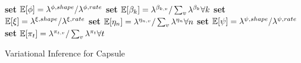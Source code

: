 \begin{algorithm}
{{	}

	\textbf{set} $\mathbb{E}[\phi] = \lambda^{\phi,shape} / \lambda^{\phi,rate}$ \;
	\textbf{set} $\mathbb{E}[\beta_k] = \lambda^{\beta_{k,v}} / \sum_v \lambda^{\beta_k} \forall k$ \;
	\textbf{set} $\mathbb{E}[\xi] = \lambda^{\xi,shape} / \lambda^{\xi,rate}$ \;
	\textbf{set} $\mathbb{E}[\eta_n] = \lambda^{\eta_{n,v}} / \sum_v \lambda^{\eta_n} \forall n$ \;
	\textbf{set} $\mathbb{E}[\psi] = \lambda^{\psi,shape} / \lambda^{\psi,rate}$ \;
	\textbf{set} $\mathbb{E}[\pi_t] = \lambda^{\pi_{t,v}} / \sum_v \lambda^{\pi_t} \forall t$ \;
}
\Return{$\lambda$} \;
\caption{Variational Inference for Capsule}
\label{alg:capsule}
\end{algorithm}



